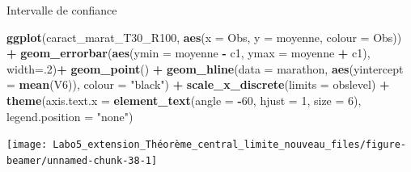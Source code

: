 \documentclass[ignorenonframetext,]{beamer}
\newenvironment{Shaded}{\begin{snugshade}}{\end{snugshade}}
\newcommand{\KeywordTok}[1]{\textcolor[rgb]{0.13,0.29,0.53}{\textbf{#1}}}
\newcommand{\DataTypeTok}[1]{\textcolor[rgb]{0.13,0.29,0.53}{#1}}
\newcommand{\DecValTok}[1]{\textcolor[rgb]{0.00,0.00,0.81}{#1}}
\newcommand{\StringTok}[1]{\textcolor[rgb]{0.31,0.60,0.02}{#1}}
\newcommand{\OperatorTok}[1]{\textcolor[rgb]{0.81,0.36,0.00}{\textbf{#1}}}
\newcommand{\NormalTok}[1]{#1}
\begin{document}
\begin{frame}[fragile]{Intervalle de confiance}

\begin{Shaded}
\begin{Highlighting}[]
\KeywordTok{ggplot}\NormalTok{(caract_marat_T30_R100, }\KeywordTok{aes}\NormalTok{(}\DataTypeTok{x =}\NormalTok{ Obs, }\DataTypeTok{y =}\NormalTok{ moyenne, }\DataTypeTok{colour =}\NormalTok{ Obs)) }\OperatorTok{+}
\StringTok{  }\KeywordTok{geom_errorbar}\NormalTok{(}\KeywordTok{aes}\NormalTok{(}\DataTypeTok{ymin =}\NormalTok{ moyenne }\OperatorTok{-}\StringTok{ }\NormalTok{c1, }\DataTypeTok{ymax =}\NormalTok{ moyenne }\OperatorTok{+}\StringTok{ }\NormalTok{c1), }\DataTypeTok{width=}\NormalTok{.}\DecValTok{2}\NormalTok{)}\OperatorTok{+}\StringTok{ }
\StringTok{  }\KeywordTok{geom_point}\NormalTok{() }\OperatorTok{+}
\StringTok{  }\KeywordTok{geom_hline}\NormalTok{(}\DataTypeTok{data =}\NormalTok{ marathon, }\KeywordTok{aes}\NormalTok{(}\DataTypeTok{yintercept =} \KeywordTok{mean}\NormalTok{(V6)), }\DataTypeTok{colour =} \StringTok{"black"}\NormalTok{) }\OperatorTok{+}
\StringTok{  }\KeywordTok{scale_x_discrete}\NormalTok{(}\DataTypeTok{limits =}\NormalTok{ obslevel) }\OperatorTok{+}
\StringTok{  }\KeywordTok{theme}\NormalTok{(}\DataTypeTok{axis.text.x =} \KeywordTok{element_text}\NormalTok{(}\DataTypeTok{angle =} \OperatorTok{-}\DecValTok{60}\NormalTok{, }\DataTypeTok{hjust =} \DecValTok{1}\NormalTok{, }\DataTypeTok{size =} \DecValTok{6}\NormalTok{), }\DataTypeTok{legend.position =} \StringTok{"none"}\NormalTok{)}
\end{Highlighting}
\end{Shaded}

\texttt{[image: Labo5\_extension\_Théorème\_central\_limite\_nouveau\_files/figure-beamer/unnamed-chunk-38-1]}

\end{frame}
\end{document}
